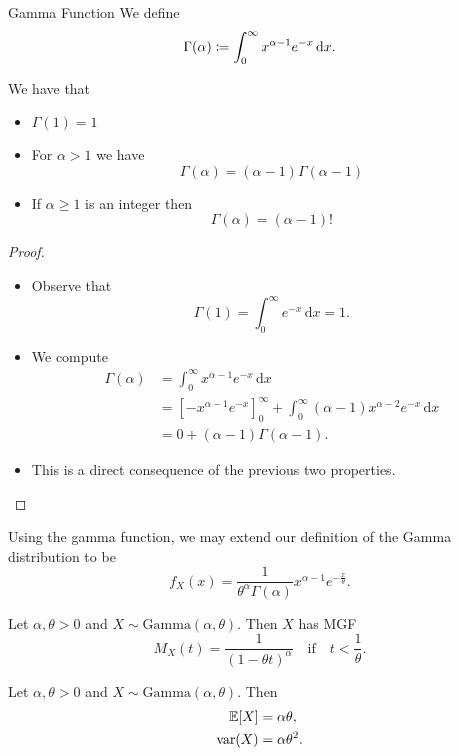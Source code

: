 \documentclass[class=article, crop=false]{standalone}
\begin{document}
  \begin{definition}{Gamma Function}
    We define
    \[
      \Gamma(\alpha) \coloneqq \int_{0}^{\infty}x^{\alpha - 1}e^{-x} \,\mathrm dx.
    \]
  \end{definition}
  \begin{theorem}{}
    We have that
    \begin{itemize}
      \item $\Gamma(1) = 1$
      \item For $\alpha > 1$ we have
      \[
        \Gamma(\alpha) = (\alpha - 1)\Gamma(\alpha - 1)
      \]
      \item If $\alpha \geq 1$ is an integer then
      \[
        \Gamma(\alpha) = (\alpha - 1)!
      \]
    \end{itemize}
    \begin{proof}
      \begin{itemize}
        \item Observe that
        \[
          \Gamma(1) = \int_{0}^{\infty}e^{-x} \,\mathrm dx = 1.
        \]
        \item We compute
        \begin{align*}
          \Gamma(\alpha) &= \int_{0}^{\infty}x^{\alpha - 1}e^{-x} \,\mathrm dx \\
                         &= [-x^{\alpha - 1}e^{-x}]_0^\infty + \int_{0}^{\infty}(\alpha - 1) x^{\alpha - 2}e^{-x}\,\mathrm dx \\
                         &= 0 + (\alpha - 1)\Gamma(\alpha - 1).
        \end{align*}
        \item This is a direct consequence of the previous two properties.
      \end{itemize}
    \end{proof}
  \end{theorem}
  \begin{note}{}
    Using the gamma function, we may extend our definition of the Gamma distribution to be
    \[
      f_X(x) = \frac{1}{\theta^\alpha\Gamma(\alpha)}x^{\alpha - 1}e^{-\frac{x}{\theta}}.
    \]
  \end{note}
  \begin{theorem}{}
    Let $\alpha, \theta > 0$ and $X\sim \mathrm{Gamma}(\alpha, \theta)$. Then $X$ has MGF
    \[
      M_X(t) = \frac{1}{(1 - \theta t)^\alpha}\quad\text{if}\quad t < \frac{1}{\theta}.
    \]
  \end{theorem}
  \begin{theorem}{}
    Let $\alpha, \theta > 0$ and $X\sim \mathrm{Gamma}(\alpha, \theta)$. Then
    \begin{align*}
      \mathbb{E}[X] &= \alpha\theta, \\
      \operatorname{var}(X) &= \alpha\theta^2.
    \end{align*}
  \end{theorem}
\end{document}
